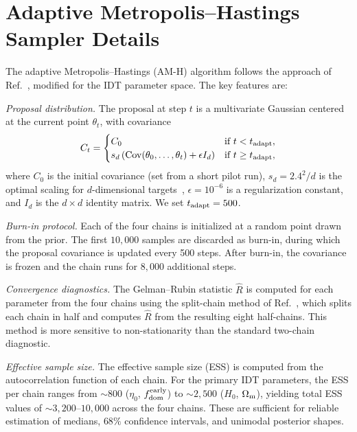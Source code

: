 \documentclass[aps,prd,twocolumn,superscriptaddress,nofootinbib]{revtex4-2}
\newcommand{\Om}{\Omega_{\rm m}}
\newcommand{\fdom}{f_{\rm dom}}
\newcommand{\Hubble}{H_0}
\newcommand{\etaz}{\eta_0}
\newcommand{\Rhat}{\hat{R}}
\begin{document}
\section{Adaptive Metropolis--Hastings Sampler Details}
\label{app:sampler}

The adaptive Metropolis--Hastings (AM-H) algorithm follows the
approach of Ref.~\cite{Haario2001}, modified for the IDT parameter
space. The key features are:

\textit{Proposal distribution.} The proposal at step $t$ is a
multivariate Gaussian centered at the current point $\theta_t$, with
covariance
\begin{equation}
C_t = \begin{cases}
C_0 & \text{if } t < t_{\rm adapt}, \\
s_d \left(\mathrm{Cov}(\theta_0, \ldots, \theta_t) +
  \epsilon I_d\right) & \text{if } t \geq t_{\rm adapt},
\end{cases}
\label{eq:proposal_cov}
\end{equation}
where $C_0$ is the initial covariance (set from a short pilot run),
$s_d = 2.4^2/d$ is the optimal scaling for $d$-dimensional
targets~\cite{Roberts1997}, $\epsilon = 10^{-6}$ is a regularization
constant, and $I_d$ is the $d \times d$ identity matrix. We set
$t_{\rm adapt} = 500$.

\textit{Burn-in protocol.} Each of the four chains is initialized at
a random point drawn from the prior. The first $10{,}000$ samples are
discarded as burn-in, during which the proposal covariance is updated
every 500 steps. After burn-in, the covariance is frozen and the
chain runs for $8{,}000$ additional steps.

\textit{Convergence diagnostics.} The Gelman--Rubin statistic
$\Rhat$ is computed for each parameter from the four chains using the
split-chain method of Ref.~\cite{Vehtari2021}, which splits each
chain in half and computes $\Rhat$ from the resulting eight
half-chains. This method is more sensitive to non-stationarity than
the standard two-chain diagnostic.

\textit{Effective sample size.} The effective sample size (ESS) is
computed from the autocorrelation function of each chain. For the
primary IDT parameters, the ESS per chain ranges from $\sim 800$
($\etaz$, $\fdom^{\rm early}$) to $\sim 2{,}500$ ($\Hubble$, $\Om$),
yielding total ESS values of $\sim 3{,}200$--$10{,}000$ across the
four chains. These are sufficient for reliable estimation of medians,
$68\%$ confidence intervals, and unimodal posterior shapes.
\end{document}
